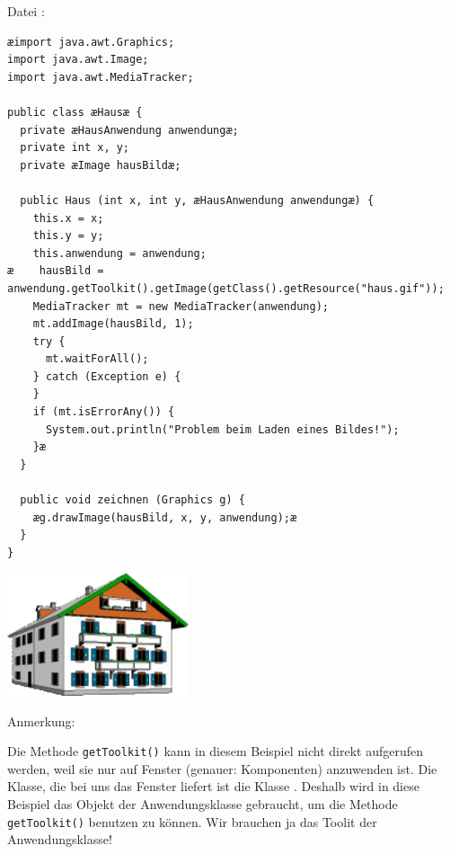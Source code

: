 \vspace{5mm}

Datei :

\begin{lstlisting}
æimport java.awt.Graphics;
import java.awt.Image;
import java.awt.MediaTracker;

public class æHausæ {
  private æHausAnwendung anwendungæ;
  private int x, y;
  private æImage hausBildæ;

  public Haus (int x, int y, æHausAnwendung anwendungæ) {
    this.x = x;
    this.y = y;
    this.anwendung = anwendung;
æ    hausBild = anwendung.getToolkit().getImage(getClass().getResource("haus.gif"));
    MediaTracker mt = new MediaTracker(anwendung);
    mt.addImage(hausBild, 1);
    try {
      mt.waitForAll();
    } catch (Exception e) {
    }
    if (mt.isErrorAny()) {
      System.out.println("Problem beim Laden eines Bildes!");
    }æ
  }

  public void zeichnen (Graphics g) {
    æg.drawImage(hausBild, x, y, anwendung);æ
  }
}
\end{lstlisting}

\vspace{12mm}

\begin{center}
\includegraphics[width=0.4\textwidth]{./inf/SEKII/13_Java_Bilder/haus.png}
\end{center}

Anmerkung:

Die Methode \lstinline|getToolkit()| kann in diesem Beispiel nicht direkt
aufgerufen werden, weil sie nur auf Fenster (genauer: Komponenten) anzuwenden
ist. Die Klasse, die bei uns das Fenster liefert ist die Klasse
. Deshalb wird in diese Beispiel das Objekt der
Anwendungsklasse gebraucht, um die Methode \lstinline|getToolkit()| benutzen zu
können. Wir brauchen ja das Toolit der Anwendungsklasse!

